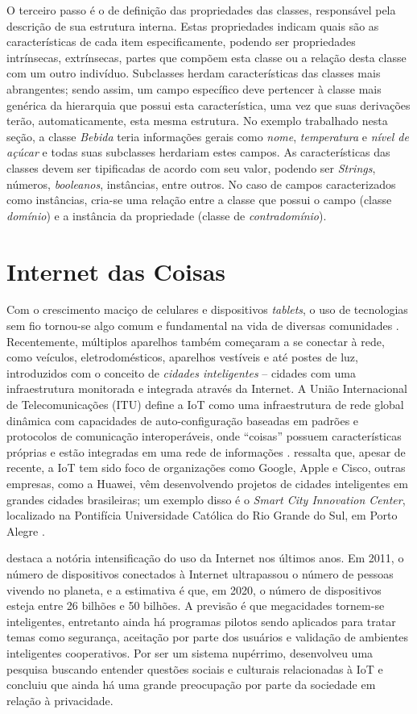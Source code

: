 O terceiro passo é o de definição das propriedades das classes, responsável pela descrição de sua estrutura interna. Estas propriedades indicam quais são as características de cada item especificamente, podendo ser propriedades intrínsecas, extrínsecas, partes que compõem esta classe ou a relação desta classe com um outro indivíduo. Subclasses herdam características das classes mais abrangentes; sendo assim, um campo específico deve pertencer à classe mais genérica da hierarquia que possui esta característica, uma vez que suas derivações terão, automaticamente, esta mesma estrutura. No exemplo trabalhado nesta seção, a classe \emph{Bebida} teria informações gerais como \emph{nome}, \emph{temperatura} e \emph{nível de açúcar} e todas suas subclasses herdariam estes campos. As características das classes devem ser tipificadas de acordo com seu valor, podendo ser \emph{Strings}, números, \emph{booleanos}, instâncias, entre outros. No caso de campos caracterizados como instâncias, cria-se uma relação entre a classe que possui o campo (classe \emph{domínio}) e a instância da propriedade (classe de \emph{contradomínio}).

\section{Internet das Coisas}
Com o crescimento maciço de celulares e dispositivos \emph{tablets}, o uso de tecnologias sem fio tornou-se algo comum e fundamental na vida de diversas comunidades \cite{SHIN2014}. Recentemente, múltiplos aparelhos também começaram a se conectar à rede, como veículos, eletrodomésticos, aparelhos vestíveis e até postes de luz, introduzidos com o conceito de \emph{cidades inteligentes} -- cidades com uma infraestrutura monitorada e integrada através da Internet. A União Internacional de Telecomunicações (ITU) define a IoT como uma infraestrutura de rede global dinâmica com capacidades de auto-configuração baseadas em padrões e protocolos de comunicação interoperáveis, onde “coisas” possuem características próprias e estão integradas em uma rede de informações \cite{FRIESS2013}. \cite{FRIESS2013} ressalta que, apesar de recente, a IoT tem sido foco de organizações como Google, Apple e Cisco, outras empresas, como a Huawei, vêm desenvolvendo projetos de cidades inteligentes em grandes cidades brasileiras; um exemplo disso é o \emph{Smart City Innovation Center}, localizado na Pontifícia Universidade Católica do Rio Grande do Sul, em Porto Alegre \cite{RIGON2016}.

\cite{FRIESS2013} destaca a notória intensificação do uso da Internet nos últimos anos. Em 2011, o número de dispositivos conectados à Internet ultrapassou o número de pessoas vivendo no planeta, e a estimativa é que, em 2020, o número de dispositivos esteja entre 26 bilhões e 50 bilhões. A previsão é que megacidades tornem-se inteligentes, entretanto ainda há programas pilotos sendo aplicados para tratar temas como segurança, aceitação por parte dos usuários e validação de ambientes inteligentes cooperativos. Por ser um sistema nupérrimo, \cite{SHIN2014} desenvolveu uma pesquisa buscando entender questões sociais e culturais relacionadas à IoT e concluiu que ainda há uma grande preocupação por parte da sociedade em relação à privacidade.

